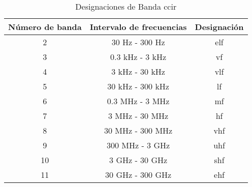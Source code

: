 \setcounter{table}{0}

\begin{table}[h!]
    \centering
    \caption{Designaciones de Banda \gls{ccir}}
    \begin{tabular}{ccc}
        \hline
        Número de banda & Intervalo de frecuencias & Designación \\
        \hline
        2 & 30 Hz - 300 Hz & \gls{elf} \\
        3 & 0.3 kHz - 3 kHz & \gls{vf} \\
        4 & 3 kHz - 30 kHz & \gls{vlf} \\
        5 & 30 kHz - 300 kHz & \gls{lf} \\
        6 & 0.3 MHz - 3 MHz & \gls{mf} \\
        7 & 3 MHz - 30 MHz & \gls{hf} \\
        8 & 30 MHz - 300 MHz & \gls{vhf} \\
        9 & 300 MHz - 3 GHz & \gls{uhf} \\
        10 & 3 GHz - 30 GHz & \gls{shf} \\
        11 & 30 GHz - 300 GHz & \gls{ehf} \\
        \hline
    \end{tabular}
\end{table}